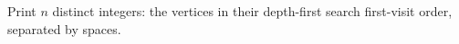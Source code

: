 Print $n$ distinct integers: the vertices in their depth-first search first-visit order, separated by spaces.
